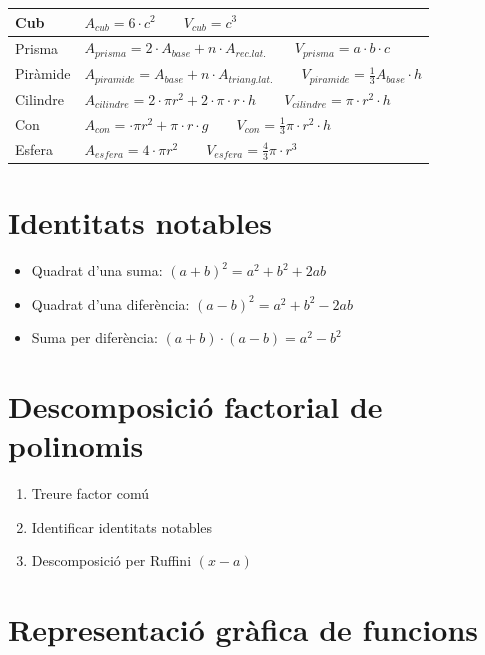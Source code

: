 \documentclass{article}
\begin{document}
\begin{tabular}{|l|l|}
 \hline
Cub& $A_{cub}=6\cdot c^2 \qquad V_{cub}=c^3$ \\
\hline
Prisma& $A_{prisma}=2\cdot A_{base}+n\cdot A_{rec. lat.} \qquad V_{prisma}=a\cdot b \cdot c$ \\
\hline
Piràmide& $A_{piramide}=A_{base}+n\cdot A_{triang. lat.} \qquad V_{piramide}=\frac{1}{3} A_{base} \cdot h$\\
\hline
Cilindre& $A_{cilindre}=2 \cdot \pi r^2+2\cdot \pi \cdot r \cdot h \qquad V_{cilindre}=\pi \cdot r^2 \cdot h$\\
\hline
Con& $A_{con}=\cdot \pi r^2+ \pi \cdot r \cdot g \qquad V_{con}=\frac{1}{3}\pi \cdot r^2 \cdot h$\\
\hline
Esfera& $A_{esfera}=4 \cdot \pi r^2 \qquad V_{esfera}=\frac{4}{3}\pi \cdot r^3$\\
\hline  
\end{tabular}

\section{Identitats notables}
\begin{itemize}
	\item Quadrat d'una suma: $(a+b)^2=a^2+b^2+2ab$
	\item Quadrat d'una diferència: $(a-b)^2=a^2+b^2-2ab$
	\item Suma per diferència: $(a+b)\cdot(a-b)=a^2-b^2$
\end{itemize}
\newpage
\section{Descomposició factorial de polinomis}

\begin{enumerate}
	\item Treure factor comú
	\item Identificar identitats notables
	\item Descomposició per Ruffini $(x-a)$
\end{enumerate}

\section{Representació gràfica de funcions}
\end{document}
